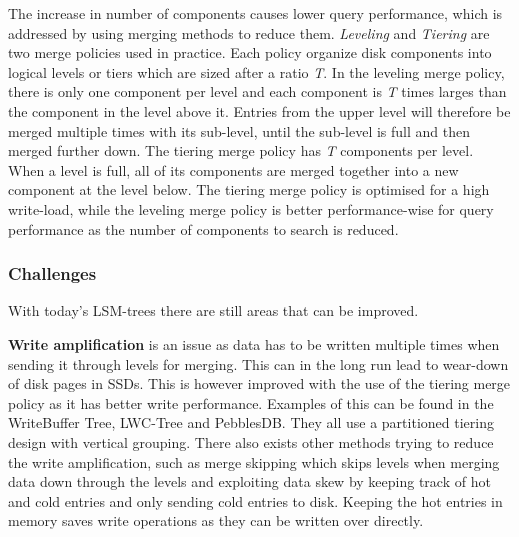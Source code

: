 The increase in number of components causes lower query performance, which is addressed by using merging methods to reduce them. \emph{Leveling} and \emph{Tiering} are two merge policies used in practice. Each policy organize disk components into logical levels or tiers which are sized after a ratio \emph{T}. In the leveling merge policy, there is only one component per level and each component is \emph{T} times larges than the component in the level above it. Entries from the upper level will therefore be merged multiple times with its sub-level, until the sub-level is full and then merged further down. The tiering merge policy has \emph{T} components per level. When a level is full, all of its components are merged together into a new component at the level below. The tiering merge policy is optimised for a high write-load, while the leveling merge policy is better performance-wise for query performance as the number of components to search is reduced\cite{LSMSurvey}. 

\subsubsection{Challenges}
With today's LSM-trees there are still areas that can be improved. \newline

\noindent
\textbf{Write amplification} is an issue as data has to be written multiple times when sending it through levels for merging. This can in the long run lead to wear-down of disk pages in SSDs. This is however improved with the use of the tiering merge policy as it has better write performance. Examples of this can be found in the WriteBuffer Tree\cite{WBTree}, LWC-Tree\cite{LWCTree1}\cite{LWCTree2} and PebblesDB\cite{PebblesDB}. They all use a partitioned tiering design with vertical grouping. There also exists other methods trying to reduce the write amplification, such as merge skipping which skips levels when merging data down through the levels\cite{SkipTree} and exploiting data skew by keeping track of hot and cold entries and only sending cold entries to disk\cite{TRIAD}. Keeping the hot entries in memory saves write operations as they can be written over directly. \newline

